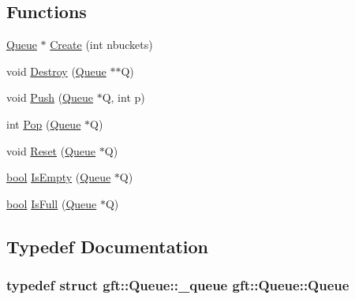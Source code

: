 \subsection*{Functions}
\begin{DoxyCompactItemize}
\item 
\hyperlink{namespacegft_1_1Queue_a40c8ceeef88d837f796d9e5e09ba8b44}{Queue} $\ast$ \hyperlink{namespacegft_1_1Queue_acd6ce8fd59f3632e1c114adbc006e045}{Create} (int nbuckets)
\item 
void \hyperlink{namespacegft_1_1Queue_a06bf61a5dfd3584eedcfbb5508b5843e}{Destroy} (\hyperlink{namespacegft_1_1Queue_a40c8ceeef88d837f796d9e5e09ba8b44}{Queue} $\ast$$\ast$Q)
\item 
void \hyperlink{namespacegft_1_1Queue_aec03c2a13668d461bd54c56afec8c5d4}{Push} (\hyperlink{namespacegft_1_1Queue_a40c8ceeef88d837f796d9e5e09ba8b44}{Queue} $\ast$Q, int p)
\item 
int \hyperlink{namespacegft_1_1Queue_af105d7a68fd083ee2b447f38c9845894}{Pop} (\hyperlink{namespacegft_1_1Queue_a40c8ceeef88d837f796d9e5e09ba8b44}{Queue} $\ast$Q)
\item 
void \hyperlink{namespacegft_1_1Queue_ab83a1ca83670fa96912cea2028463fcd}{Reset} (\hyperlink{namespacegft_1_1Queue_a40c8ceeef88d837f796d9e5e09ba8b44}{Queue} $\ast$Q)
\item 
\hyperlink{namespacegft_a033dba4822661600b08d2bbf16879252}{bool} \hyperlink{namespacegft_1_1Queue_a34c085e90a33cb7538005892313bd4f2}{Is\-Empty} (\hyperlink{namespacegft_1_1Queue_a40c8ceeef88d837f796d9e5e09ba8b44}{Queue} $\ast$Q)
\item 
\hyperlink{namespacegft_a033dba4822661600b08d2bbf16879252}{bool} \hyperlink{namespacegft_1_1Queue_a1e065bf4081b9b59afd04441ee931860}{Is\-Full} (\hyperlink{namespacegft_1_1Queue_a40c8ceeef88d837f796d9e5e09ba8b44}{Queue} $\ast$Q)
\end{DoxyCompactItemize}


\subsection{Typedef Documentation}
\hypertarget{namespacegft_1_1Queue_a40c8ceeef88d837f796d9e5e09ba8b44}{
\subsubsection[{Queue}]{\setlength{\rightskip}{0pt plus 5cm}typedef struct {\bf gft\-::\-Queue\-::\-\_\-queue}  {\bf gft\-::\-Queue\-::\-Queue}}}\label{namespacegft_1_1Queue_a40c8ceeef88d837f796d9e5e09ba8b44}


